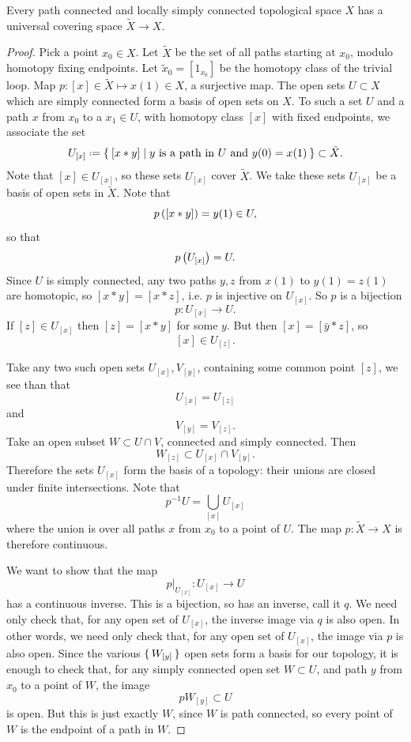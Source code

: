 \begin{theorem}\label{theorem:existence.of.universal.cover}
Every path connected and locally simply connected topological space \(X\) has a universal covering space \(\tilde{X} \to X\).
\end{theorem}
\begin{proof}
Pick a point \(x_0 \in X\).
Let \(\tilde{X}\) be the set of all paths starting at \(x_0\), modulo homotopy fixing endpoints.
Let \(\tilde{x}_0=\left[1_{x_0}\right]\) be the homotopy class of the trivial loop.
Map \(p \colon [x] \in \tilde{X} \mapsto x(1) \in X\), a surjective map.
The open sets \(U \subset X\) which are simply connected form a basis of open sets on \(X\).
To such a set \(U\) and a path \(x\) from \(x_0\) to a \(x_1 \in U\), with homotopy class \([x]\) with fixed endpoints, we associate the set
\[
U_{[x]} \defeq \Set{[x*y]|\text{\(y\) is a path in \(U\) and \(y(0)=x(1)\)}} \subset \tilde{X}.
\]
Note that \([x] \in U_{[x]}\), so these sets \(U_{[x]}\) cover \(\tilde{X}\).
We take these sets \(U_{[x]}\) be a basis of open sets in \(\tilde{X}\).
Note that
\[
p\left([x*y]\right)=y(1) \in U,
\] 
so that
\[
p\left(U_{[x]}\right)=U.
\]
Since \(U\) is simply connected, any two paths \(y, z\) from \(x(1)\) to \(y(1)=z(1)\) are homotopic, so \([x*y]=[x*z]\), i.e. \(p\) is injective on \(U_{[x]}\).
So \(p\) is a bijection 
\[
p \colon U_{[x]} \to U.
\]
If \([z] \in U_{[x]}\) then \([z]=[x*y]\) for some \(y\).
But then \([x]=[\bar{y} * z]\), so
\[
[x] \in U_{[z]}.
\]

Take any two such open sets \(U_{[x]}, V_{[y]}\), containing some common point \([z]\), we see than that 
\[
U_{[x]}=U_{[z]}
\]
and
\[
V_{[y]}=V_{[z]}.
\]
Take an open subset \(W \subset U \cap V\), connected and simply connected.
Then
\[
W_{[z]} \subset U_{[x]} \cap V_{[y]}.
\]
Therefore the sets \(U_{[x]}\) form the basis of a topology: their unions are closed under finite intersections.
Note that
\[
p^{-1}U = \bigcup_{[x]} U_{[x]}
\]
where the union is over all paths \(x\) from \(x_0\) to a point of \(U\).
The map \(p \colon \tilde{X} \to X\) is therefore continuous.

We want to show that the map
\[
\left.p\right|_{U_{[x]}} \colon U_{[x]} \to U
\]
has a continuous inverse.
This is a bijection, so has an inverse, call it \(q\).
We need only check that, for any open set of \(U_{[x]}\), the inverse image via \(q\) is also open.
In other words, we need only check that, for any open set of \(U_{[x]}\), the image via \(p\) is also open.
Since the various \(\set{W_{[y]}}\) open sets form a basis for our topology, it is enough to check that, for any simply connected open set \(W \subset U\), and path \(y\) from \(x_0\) to a point of \(W\), the image
\[
p W_{[y]} \subset U
\]
is open.
But this is just exactly \(W\), since \(W\) is path connected, so every point of \(W\) is the endpoint of a path in \(W\).


\end{proof}

